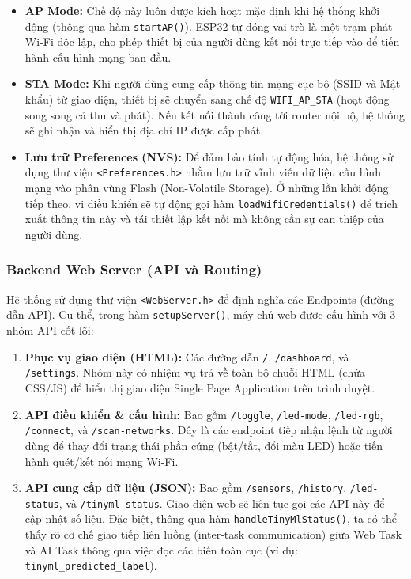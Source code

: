 \begin{itemize}
    \item \textbf{AP Mode:} Chế độ này luôn được kích hoạt mặc định khi hệ thống khởi động (thông qua hàm \texttt{startAP()}). ESP32 tự đóng vai trò là một trạm phát Wi-Fi độc lập, cho phép thiết bị của người dùng kết nối trực tiếp vào để tiến hành cấu hình mạng ban đầu.
    
    \item \textbf{STA Mode:} Khi người dùng cung cấp thông tin mạng cục bộ (SSID và Mật khẩu) từ giao diện, thiết bị sẽ chuyển sang chế độ \texttt{WIFI\_AP\_STA} (hoạt động song song cả thu và phát). Nếu kết nối thành công tới router nội bộ, hệ thống sẽ ghi nhận và hiển thị địa chỉ IP được cấp phát.
    
    \item \textbf{Lưu trữ Preferences (NVS):} Để đảm bảo tính tự động hóa, hệ thống sử dụng thư viện \texttt{<Preferences.h>} nhằm lưu trữ vĩnh viễn dữ liệu cấu hình mạng vào phân vùng Flash (Non-Volatile Storage). Ở những lần khởi động tiếp theo, vi điều khiển sẽ tự động gọi hàm \texttt{loadWifiCredentials()} để trích xuất thông tin này và tái thiết lập kết nối mà không cần sự can thiệp của người dùng.
\end{itemize}

\subsubsection{Backend Web Server (API và Routing)}

Hệ thống sử dụng thư viện \texttt{<WebServer.h>} để định nghĩa các Endpoints (đường dẫn API). Cụ thể, trong hàm \texttt{setupServer()}, máy chủ web được cấu hình với 3 nhóm API cốt lõi:

\begin{enumerate}
    \item \textbf{Phục vụ giao diện (HTML):} Các đường dẫn \texttt{/}, \texttt{/dashboard}, và \texttt{/settings}. Nhóm này có nhiệm vụ trả về toàn bộ chuỗi HTML (chứa CSS/JS) để hiển thị giao diện Single Page Application trên trình duyệt.
    
    \item \textbf{API điều khiển \& cấu hình:} Bao gồm \texttt{/toggle}, \texttt{/led-mode}, \texttt{/led-rgb}, \texttt{/connect}, và \texttt{/scan-networks}. Đây là các endpoint tiếp nhận lệnh từ người dùng để thay đổi trạng thái phần cứng (bật/tắt, đổi màu LED) hoặc tiến hành quét/kết nối mạng Wi-Fi.
    
    \item \textbf{API cung cấp dữ liệu (JSON):} Bao gồm \texttt{/sensors}, \texttt{/history}, \texttt{/led-status}, và \texttt{/tinyml-status}. Giao diện web sẽ liên tục gọi các API này để cập nhật số liệu. Đặc biệt, thông qua hàm \texttt{handleTinyMlStatus()}, ta có thể thấy rõ cơ chế giao tiếp liên luồng (inter-task communication) giữa Web Task và AI Task thông qua việc đọc các biến toàn cục (ví dụ: \texttt{tinyml\_predicted\_label}).
\end{enumerate}

